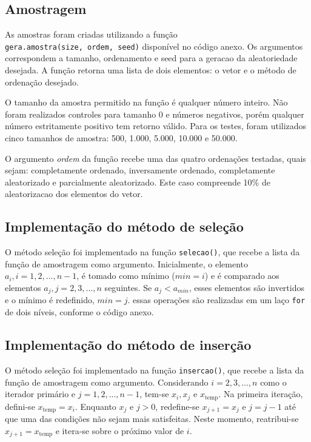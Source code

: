 \documentclass[
]{article}
\begin{document}
\hypertarget{amostragem}{%
\subsection{Amostragem}\label{amostragem}}

As amostras foram criadas utilizando a função
\texttt{gera.amostra(size,\ ordem,\ seed)} disponível no código anexo.
Os argumentos correspondem a tamanho, ordenamento e seed para a geracao
da aleatoriedade desejada. A função retorna uma lista de dois elementos:
o vetor e o método de ordenação desejado.

O tamanho da amostra permitido na função é qualquer número inteiro. Não
foram realizados controles para tamanho 0 e números negativos, porém
qualquer número estritamente positivo tem retorno válido. Para os
testes, foram utilizados cinco tamanhos de amostra: 500, 1.000, 5.000,
10.000 e 50.000.

O argumento \emph{ordem} da função recebe uma das quatro ordenações
testadas, quais sejam: completamente ordenado, inversamente ordenado,
completamente aleatorizado e parcialmente aleatorizado. Este caso
compreende 10\% de aleatorizacao dos elementos do vetor.

\hypertarget{implementauxe7uxe3o-do-muxe9todo-de-seleuxe7uxe3o}{%
\subsection{Implementação do método de
seleção}\label{implementauxe7uxe3o-do-muxe9todo-de-seleuxe7uxe3o}}

O método seleção foi implementado na função \texttt{selecao()}, que
recebe a lista da função de amostragem como argumento. Inicialmente, o
elemento \(a_i, i = 1, 2, ..., n-1\), é tomado como mínimo (\(min = i\))
e é comparado aos elementos \(a_j, j = 2, 3, ..., n\) seguintes. Se
\(a_j < a_{min}\), esses elementos são invertidos e o mínimo é
redefinido, \(min = j\). essas operações são realizadas em um laço
\texttt{for} de dois níveis, conforme o código anexo.

\hypertarget{implementauxe7uxe3o-do-muxe9todo-de-inseruxe7uxe3o}{%
\subsection{Implementação do método de
inserção}\label{implementauxe7uxe3o-do-muxe9todo-de-inseruxe7uxe3o}}

O método seleção foi implementado na função \texttt{insercao()}, que
recebe a lista da função de amostragem como argumento. Considerando
\(i = 2, 3, ..., n\) como o iterador primário e \(j = 1, 2, ..., n-1\),
tem-se \(x_i, x_j\) e \(x_{\text{temp}}\). Na primeira iteração,
defini-se \(x_{\text{temp}} = x_i\). Enquanto \(x_j\) e \(j>0\),
redefine-se \(x_{j+1} = x_j\) e \(j = j-1\) até que uma das condições
não sejam mais satisfeitas. Neste momento, reatribui-se
\(x_{j+1} = x_{\text{temp}}\) e itera-se sobre o próximo valor de \(i\).
\end{document}
